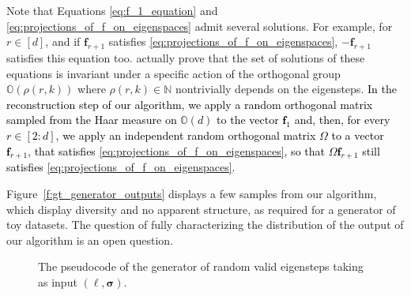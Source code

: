 \documentclass[twoside,11pt]{book}
\newcommand{\rev}[1]{\textcolor{black}{#1}}
\numberwithin{theorem}{chapter}
\numberwithin{definition}{chapter}
\numberwithin{proposition}{chapter}
\numberwithin{corollary}{chapter}
\numberwithin{example}{chapter}
\numberwithin{lemma}{chapter}
\numberwithin{assumption}{chapter}
\numberwithin{equation}{chapter}
\numberwithin{figure}{chapter}
\begin{document}
\begin{subappendices}
Note that Equations \eqref{eq:f_1_equation} and \eqref{eq:projections_of_f_on_eigenspaces} admit several solutions. For example, for $r \in [d]$, and if $\bm{f}_{r+1}$ satisfies \eqref{eq:projections_of_f_on_eigenspaces}, $-\bm{f}_{r+1}$ satisfies this equation too. \cite{FiMiPo11} actually prove that the set of solutions of these equations is invariant under a specific action of the orthogonal group $\mathbb{O}(\rho(r,k))$ where $\rho(r,k) \in \mathbb{N}$ nontrivially depends on the eigensteps. \rev{In the reconstruction step of our algorithm, we apply a random orthogonal matrix sampled from the Haar measure on $\mathbb{O}(d)$ to the vector $\bm{f}_{1}$ and, then, for every $r \in [2:d]$, we apply an independent random orthogonal matrix $\Omega$ to a vector $\bm{f}_{r+1}$, that satisfies \eqref{eq:projections_of_f_on_eigenspaces}, so that $\Omega \bm{f}_{r+1}$ still satisfies \eqref{eq:projections_of_f_on_eigenspaces}.}



Figure~\ref{f:gt_generator_outputs} displays a few samples from our algorithm, which display diversity and no apparent structure, as required for a generator of toy datasets. The question of fully characterizing the distribution of the output of our algorithm is an open question.

\begin{figure}
\centerline{
}
\caption{The pseudocode of the generator of random valid eigensteps taking as input $(\bm{\ell},\bm{\sigma})$.}
\label{f:Algo_Random_Eigensteps}
\end{figure}
\end{subappendices}
\end{document}
